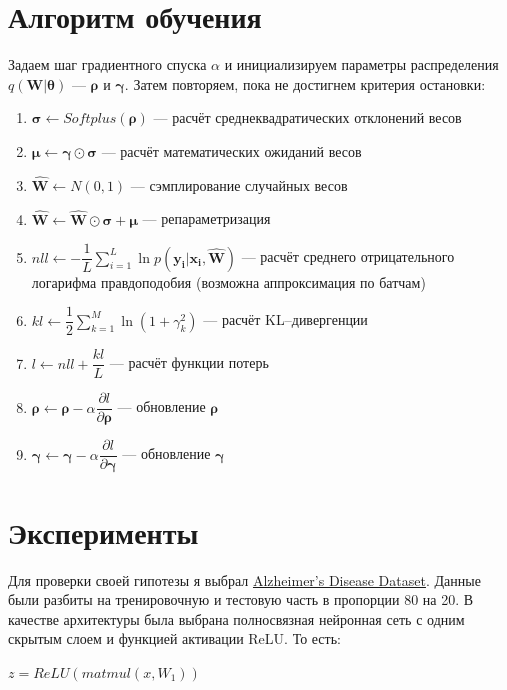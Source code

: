 \documentclass{article}
\begin{document}
\section{Алгоритм обучения}
Задаем шаг градиентного спуска $\alpha$ и инициализируем параметры распределения $q(\mathbf{W} | \pmb{\theta})$ — $\pmb{\rho}$ и $\pmb{\gamma}$. Затем повторяем, пока не достигнем критерия остановки:
\begin{enumerate}
    \item $\pmb{\sigma} \leftarrow Softplus(\pmb{\rho})$ --- расчёт среднеквадратических отклонений весов
    \item $\pmb{\mu} \leftarrow \pmb{\gamma} \odot \pmb{\sigma}$ --- расчёт математических ожиданий весов
    \item $\hat{\mathbf{W}} \leftarrow N(0, 1)$ --- сэмплирование случайных весов
    \item $\hat{\mathbf{W}} \leftarrow \hat{\mathbf{W}} \odot \pmb{\sigma} + \pmb{\mu}$ --- репараметризация
    \item $nll \leftarrow -\dfrac{1}{L}\sum_{i=1}^{L}{\ln{p( \mathbf{y_{i}} | \mathbf{x_{i}}, \mathbf{\hat{W}})}}$ --- расчёт среднего отрицательного логарифма правдоподобия (возможна аппроксимация по батчам)
    \item $kl \leftarrow \dfrac{1}{2}\sum_{k=1}^{M}\ln({1 + \gamma_{k}^{2}})$ --- расчёт KL--дивергенции
    \item $l \leftarrow nll + \dfrac{kl}{L}$ --- расчёт функции потерь
    \item $\pmb{\rho} \leftarrow \pmb{\rho} - \alpha \dfrac{\partial l}{\partial \pmb{\rho}}$ --- обновление $\pmb{\rho}$
    \item $\pmb{\gamma} \leftarrow \pmb{\gamma} - \alpha \dfrac{\partial l}{\partial \pmb{\gamma}}$ --- обновление $\pmb{\gamma}$
\end{enumerate}

\section{Эксперименты}

Для проверки своей гипотезы я выбрал \href{https://www.kaggle.com/datasets/rabieelkharoua/alzheimers-disease-dataset}{Alzheimer's Disease Dataset}. Данные были разбиты на тренировочную и тестовую часть в пропорции 80 на 20. В качестве архитектуры была выбрана полносвязная нейронная сеть с одним скрытым слоем и функцией активации ReLU. То есть:

$z = ReLU(matmul(x, W_1))$
\end{document}
